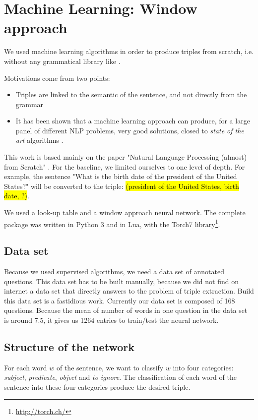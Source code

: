 \section{Machine Learning: Window approach}


We used machine learning algorithms in order to produce triples from scratch, i.e. without any grammatical library like \Stanford.

Motivations come from two points:
\begin{itemize}
\item Triples are linked to the semantic of the sentence, and not directly from the grammar
\item It has been shown that a machine learning approach can produce, for a large panel of different NLP problems, very good solutions, closed to \textit{state of the art} algorithms \cite{collobert}.
\end{itemize}

This work is based mainly on the paper "Natural Language Processing (almost) from Scratch" \cite{collobert}.
For the baseline, we limited ourselves to one level of depth.
For example, the sentence "What is the birth date of the president of the United States?" will be converted to the triple: 
\hl{(president of the United States, birth date, ?)}. 

We used a look-up table and a window approach neural network. The complete package was written in Python 3 and in Lua, with the Torch7 library\footnote{\url{http://torch.ch/}}.

\subsection{Data set}

Because we used supervised algorithms, we need a data set of annotated questions.
This data set has to be built manually, because we did not find on internet a data set that directly answers to the problem of triple extraction.
Build this data set is a fastidious work. Currently our data set is composed of 168 questions.
Because the mean of number of words in one question in the data set is around 7.5, it gives us 1264 entries to train/test the neural network.

\subsection{Structure of the network}

For each word $w$ of the sentence, we want to classify $w$ into four categories: \textit{subject}, \textit{predicate}, \textit{object} and \textit{to ignore}.
The classification of each word of the sentence into these four categories produce the desired triple.

